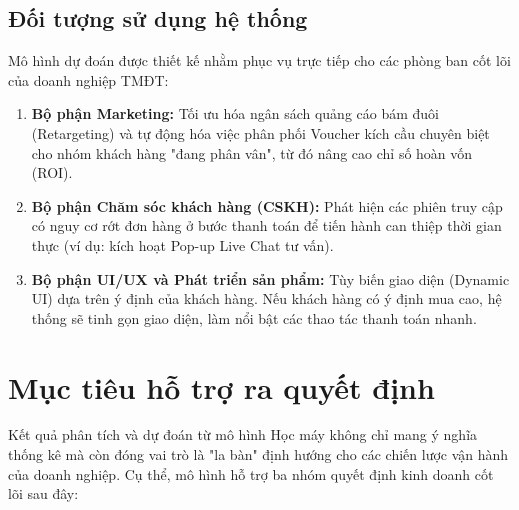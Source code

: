 \documentclass[a4paper,11pt]{article}
\begin{document}
\subsection{Đối tượng sử dụng hệ thống}
Mô hình dự đoán được thiết kế nhằm phục vụ trực tiếp cho các phòng ban cốt lõi của doanh nghiệp TMĐT:
\begin{enumerate}[itemsep=4pt, leftmargin=*]
    \item \textbf{Bộ phận Marketing:} Tối ưu hóa ngân sách quảng cáo bám đuôi (Retargeting) và tự động hóa việc phân phối Voucher kích cầu chuyên biệt cho nhóm khách hàng "đang phân vân", từ đó nâng cao chỉ số hoàn vốn (ROI).
    \item \textbf{Bộ phận Chăm sóc khách hàng (CSKH):} Phát hiện các phiên truy cập có nguy cơ rớt đơn hàng ở bước thanh toán để tiến hành can thiệp thời gian thực (ví dụ: kích hoạt Pop-up Live Chat tư vấn).
    \item \textbf{Bộ phận UI/UX và Phát triển sản phẩm:} Tùy biến giao diện (Dynamic UI) dựa trên ý định của khách hàng. Nếu khách hàng có ý định mua cao, hệ thống sẽ tinh gọn giao diện, làm nổi bật các thao tác thanh toán nhanh.
\end{enumerate}
\section{Mục tiêu hỗ trợ ra quyết định}
Kết quả phân tích và dự đoán từ mô hình Học máy không chỉ mang ý nghĩa thống kê mà còn đóng vai trò là "la bàn" định hướng cho các chiến lược vận hành của doanh nghiệp. Cụ thể, mô hình hỗ trợ ba nhóm quyết định kinh doanh cốt lõi sau đây:
\end{document}
